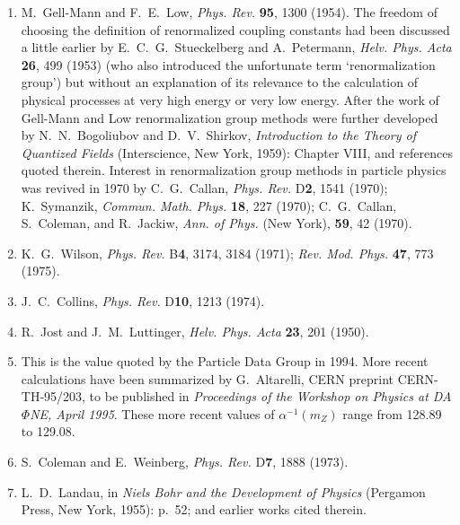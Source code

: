 \begin{enumerate}
  \setlength{\itemsep}{0.35\baselineskip}
  \item {}\label{ch18-ref-1}
  M.~Gell-Mann and F.~E.~Low, \textit{Phys. Rev.} \textbf{95}, 1300 (1954). The freedom of choosing the definition of renormalized coupling constants had been discussed a little earlier by E.~C.~G.~Stueckelberg and A.~Petermann, \textit{Helv. Phys. Acta} \textbf{26}, 499 (1953) (who also introduced the unfortunate term `renormalization group') but without an explanation of its relevance to the calculation of physical processes at very high energy or very low energy. After the work of Gell-Mann and Low renormalization group methods were further developed by N.~N.~Bogoliubov and D.~V.~Shirkov, \textit{Introduction to the Theory of Quantized Fields} (Interscience, New York, 1959): Chapter VIII, and references quoted therein. Interest in renormalization group methods in particle physics was revived in 1970 by C.~G.~Callan, \textit{Phys. Rev.} D\textbf{2}, 1541 (1970); K.~Symanzik, \textit{Commun. Math. Phys.} \textbf{18}, 227 (1970); C.~G.~Callan, S.~Coleman, and R.~Jackiw, \textit{Ann. of Phys.} (New York), \textbf{59}, 42 (1970).

  \item {}\label{ch18-ref-2}
  K.~G.~Wilson, \textit{Phys. Rev.} B\textbf{4}, 3174, 3184 (1971); \textit{Rev. Mod. Phys.} \textbf{47}, 773 (1975).

  \item {}\label{ch18-ref-3}
  J.~C.~Collins, \textit{Phys. Rev.} D\textbf{10}, 1213 (1974).

  \item[3a.] \label{ch18-ref-3a}
  R.~Jost and J.~M.~Luttinger, \textit{Helv. Phys. Acta} \textbf{23}, 201 (1950).

  \item {}\label{ch18-ref-4}
  This is the value quoted by the Particle Data Group in 1994. More recent calculations have been summarized by G.~Altarelli, CERN preprint CERN-TH-95/203, to be published in \textit{Proceedings of the Workshop on Physics at DA$\Phi$NE, April 1995}. These more recent values of $\alpha^{-1}(m_Z)$ range from 128.89 to 129.08.

  \item[4a.] \label{ch18-ref-4a}
  S.~Coleman and E.~Weinberg, \textit{Phys. Rev.} D\textbf{7}, 1888 (1973).

  \item[4b.] \label{ch18-ref-4b}
  L.~D.~Landau, in \textit{Niels Bohr and the Development of Physics} (Pergamon Press, New York, 1955): p.~52; and earlier works cited therein.


\end{enumerate}

